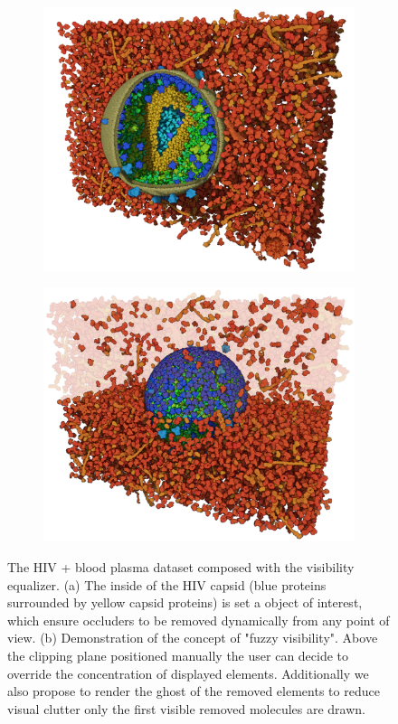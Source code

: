 \begin{figure}
	\centering
	\begin{subfigure}{.6\textwidth}
		\centering
		\includegraphics[width=.99\linewidth]{"graphics/Picture4"}
		\caption{}
		\label{fig:sub1}
	\end{subfigure}%
	\begin{subfigure}{.4\textwidth}
		\centering
		\includegraphics[width=.99\linewidth]{"graphics/Picture8"}
		\caption{}
		\label{fig:sub2}
	\end{subfigure}
	\caption{The HIV + blood plasma dataset composed with the visibility equalizer. (a) The inside of the HIV capsid (blue proteins surrounded by yellow capsid proteins) is set a object of interest, which ensure occluders to be removed dynamically from any point of view. (b) Demonstration of the concept of "fuzzy visibility". Above the clipping plane positioned manually the user can decide to override the concentration of displayed elements. Additionally we also propose to render the ghost of the removed elements to reduce visual clutter only the first visible removed molecules are drawn.}
	\label{fig:test2}
\end{figure}

